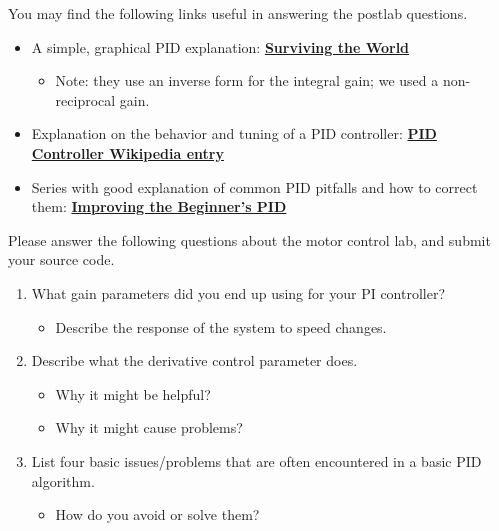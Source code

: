 \documentclass[openany,11pt,fleqn]{book} %
\begin{document}
You may find the following links useful in answering the postlab questions.
\begin{itemize}
	\item A simple, graphical PID explanation: \href{http://survivingtheworld.net/ScienceComic3.html}{\textbf{Surviving the World}}
	\begin{itemize}
		\item Note: they use an inverse form for the integral gain; we used a non-reciprocal gain.
	\end{itemize}
	\item Explanation on the behavior and tuning of a PID controller: \href{https://en.wikipedia.org/wiki/PID\_controller}{\textbf{PID Controller Wikipedia entry}}
	\item Series with good explanation of common PID pitfalls and how to correct them:  \href{http://brettbeauregard.com/blog/2011/04/improving-the-beginners-pid-introduction/}{\textbf{Improving the Beginner's PID}}
\end{itemize}

\begin{question}[Postlab 8]
	Please answer the following questions about the motor control lab, and submit your source code.
	\begin{enumerate}
		\item What gain parameters did you end up using for your PI controller?
		\begin{itemize}
			\item Describe the response of the system to speed changes.
		\end{itemize}
		\item Describe what the derivative control parameter does.
		\begin{itemize}
			\item Why it might be helpful?
			\item Why it might cause problems?
		\end{itemize}
		\item List four basic issues/problems that are often encountered in a basic PID algorithm.
		\begin{itemize}
			\item How do you avoid or solve them?
		\end{itemize}
		
	\end{enumerate}
\end{question}
\end{document}
